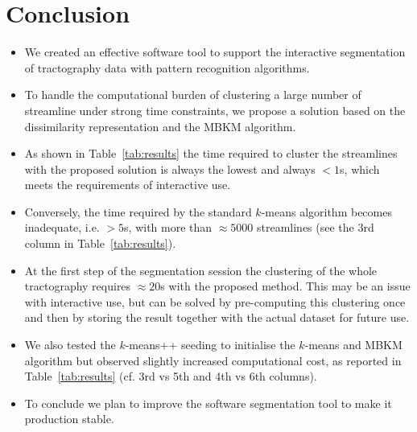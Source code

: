 \section{Conclusion}
\label{sec:discussion}
\begin{itemize}
\item We created an effective software tool to support the interactive
  segmentation of tractography data with pattern recognition
  algorithms.
\item To handle the computational burden of clustering a large number
  of streamline under strong time constraints, we propose a solution
  based on the dissimilarity representation and the MBKM algorithm.
\item As shown in Table~\ref{tab:results} the time required to cluster
  the streamlines with the proposed solution is always the lowest and
  always $<1$s, which meets the requirements of interactive use.
\item Conversely, the time required by the standard $k$-means
  algorithm becomes inadequate, i.e. $>5$s, with more than $\approx
  5000$ streamlines (see the 3rd column in Table~\ref{tab:results}).
\item At the first step of the segmentation session the clustering of
  the whole tractography requires $\approx 20$s with the proposed
  method. This may be an issue with interactive use, but can be solved
  by pre-computing this clustering once and then by storing the result
  together with the actual dataset for future use.
\item We also tested the $k$-means++ seeding to initialise the
  $k$-means and MBKM algorithm but observed slightly increased
  computational cost, as reported in Table~\ref{tab:results} (cf. 3rd
  vs 5th and 4th vs 6th columns).
\item To conclude we plan to improve the software segmentation tool to
  make it production stable.
\end{itemize}

